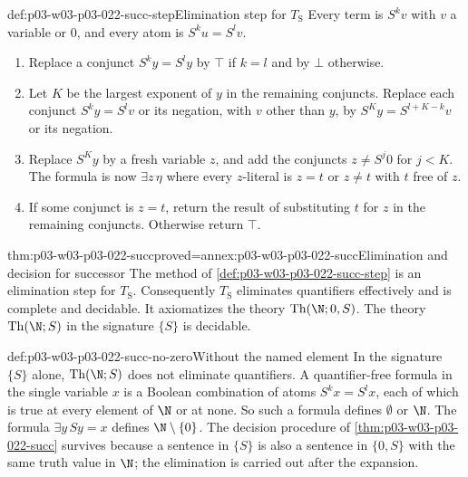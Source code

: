 \begin{hbmethod}{def:p03-w03-p03-022-succ-step}{Elimination step for \(T_{\mathrm S}\)}
Every term is \(S^kv\) with \(v\) a variable or \(0\), and every atom is
\(S^ku=S^lv\).
\begin{enumerate}
\item Replace a conjunct \(S^ky=S^ly\) by \(\top\) if \(k=l\) and by
  \(\bot\) otherwise.
\item Let \(K\) be the largest exponent of \(y\) in the remaining
  conjuncts. Replace each conjunct \(S^ky=S^lv\) or its negation, with
  \(v\) other than \(y\), by \(S^Ky=S^{l+K-k}v\) or its negation.
\item Replace \(S^Ky\) by a fresh variable \(z\), and add the conjuncts
  \(z\ne S^j0\) for \(j<K\). The formula is now
  \(\exists z\,\eta\) where every \(z\)-literal is \(z=t\) or \(z\ne t\)
  with \(t\) free of \(z\).
\item If some conjunct is \(z=t\), return the result of substituting
  \(t\) for \(z\) in the remaining conjuncts. Otherwise return \(\top\).
\end{enumerate}
\end{hbmethod}

\begin{hbtheorem}{thm:p03-w03-p03-022-succ}{proved=annex:p03-w03-p03-022-succ}{Elimination and decision for successor}
The method of \cref{def:p03-w03-p03-022-succ-step} is an elimination step
for \(T_{\mathrm S}\). Consequently \(T_{\mathrm S}\) eliminates quantifiers
effectively and is complete and decidable. It axiomatizes the theory
\(\operatorname{Th}(\N;0,S)\). The theory \(\operatorname{Th}(\N;S)\) in the
signature \(\{S\}\) is decidable.
\end{hbtheorem}

\begin{hbwarning}{def:p03-w03-p03-022-succ-no-zero}{Without the named element}
In the signature \(\{S\}\) alone, \(\operatorname{Th}(\N;S)\) does not
eliminate quantifiers. A quantifier-free formula in the single variable
\(x\) is a Boolean combination of atoms \(S^kx=S^lx\), each of which is
true at every element of \(\N\) or at none. So such a formula defines
\(\emptyset\) or \(\N\). The formula \(\exists y\,Sy=x\) defines
\(\N\setminus\{0\}\). The decision procedure of
\cref{thm:p03-w03-p03-022-succ} survives because a sentence in \(\{S\}\)
is also a sentence in \(\{0,S\}\) with the same truth value in \(\N\);
the elimination is carried out after the expansion.
\end{hbwarning}


